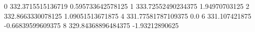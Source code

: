0 332.3715515136719 0.595733642578125
1 333.72552490234375 1.94970703125
2 332.8663330078125 1.09051513671875
4 331.77581787109375 0.0
6 331.107421875 -0.66839599609375
8 329.84368896484375 -1.93212890625

